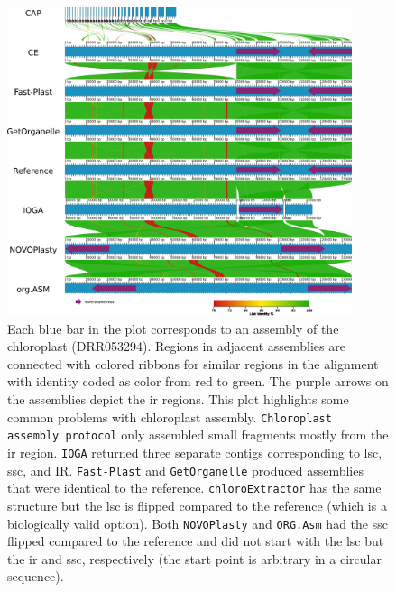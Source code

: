 \documentclass{bmcart}
\newcommand{\formatprogramnames}[1]{\texttt{#1}}
\newcommand{\ce}{\formatprogramnames{chloroExtractor}}
\newcommand{\oa}{\formatprogramnames{ORG.Asm}}
\newcommand{\fp}{\formatprogramnames{Fast-Plast}}
\newcommand{\ioga}{\formatprogramnames{IOGA}}
\newcommand{\np}{\formatprogramnames{NOVOPlasty}}
\newcommand{\go}{\formatprogramnames{GetOrganelle}}
\newcommand{\cassp}{\formatprogramnames{Chloroplast assembly protocol}}
\begin{document}
\begin{backmatter}
\begin{figure}[h!]
  \centering
  \includegraphics[width=0.9\textwidth]{manuscript/plots/AliTV.png}
  \caption{ Each blue bar in the plot corresponds to an assembly of the  chloroplast (DRR053294). Regions in adjacent assemblies are connected with colored ribbons for similar regions in the alignment with identity coded as color from red to green. The purple arrows on the assemblies depict the \gls{ir} regions. This plot highlights some common problems with chloroplast assembly. \cassp{} only assembled small fragments mostly from the \gls{ir} region. \ioga{} returned three separate contigs corresponding to \gls{lsc}, \gls{ssc}, and IR. \fp{} and \go{} produced assemblies that were identical to the reference. \ce{} has the same structure but the \gls{lsc} is flipped compared to the reference (which is a biologically valid option). Both \np{} and \oa{} had the \gls{ssc} flipped compared to the reference and did not start with the \gls{lsc} but the \gls{ir} and \gls{ssc}, respectively (the start point is arbitrary in a circular sequence).%
      }
      \label{fig:alitv}
      \end{figure}


\end{backmatter}
\end{document}
